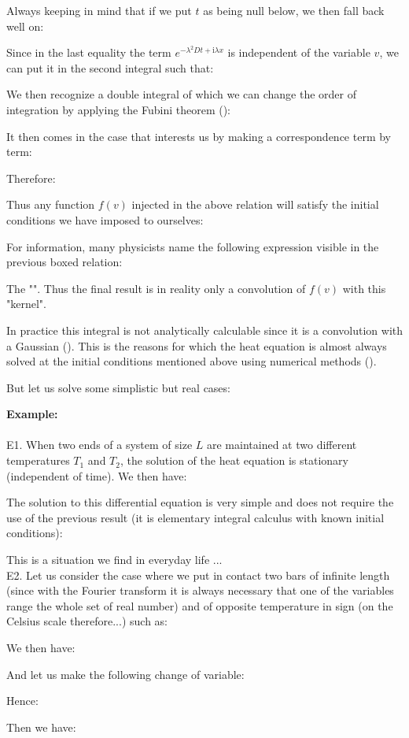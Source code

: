	Always keeping in mind that if we put $t$ as being null below, we then fall back well on:
	
	Since in the last equality the term $e^{-\lambda^2 Dt+\mathrm{i}\lambda x}$ is independent of the variable $v$, we can put it in the second integral such that:
	
	We then recognize a double integral of which we can change the order of integration by applying the Fubini theorem ():
	
	It then comes in the case that interests us by making a correspondence term by term:
	
	Therefore:
	
	Thus any function $f(v)$ injected in the above relation will satisfy the initial conditions we have imposed to ourselves:
	
	For information, many physicists name the following expression visible in the previous boxed relation:
	
	The "". Thus the final result is in reality only a convolution of $f (v)$ with this "kernel".
	
	In practice this integral is not analytically calculable since it is a convolution with a Gaussian (). This is the reasons for which the heat equation is almost always solved at the initial conditions mentioned above using numerical methods ().

	But let us solve some simplistic but real cases:
	\begin{tcolorbox}[colframe=black,colback=white,sharp corners]
	\textbf{{\Large {}}Example:}\\\\
	E1. When two ends of a system of size $L$ are maintained at two different temperatures $T_1$ and $T_2$, the solution of the heat equation is stationary (independent of time). We then have:
	
	The solution to this differential equation is very simple and does not require the use of the previous result (it is elementary integral calculus with known initial conditions):
	
	This is a situation we find in everyday life ...\\
	
	E2. Let us consider the case where we put in contact two bars of infinite length (since with the Fourier transform it is always necessary that one of the variables range the whole set of real number) and of opposite temperature in sign (on the Celsius scale therefore...) such as:
	
	We then have:
	
	And let us make the following change of variable:
	
	Hence:
	
	Then we have:	
	\end{tcolorbox}
	
